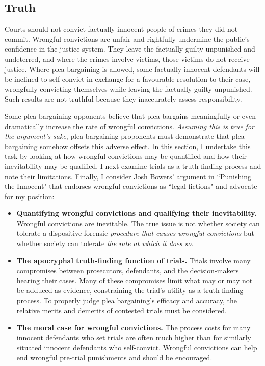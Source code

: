 \subsection{Truth}

Courts should not convict factually innocent people of crimes they did not commit. Wrongful convictions are unfair and rightfully undermine the public's confidence in the justice system. They leave the factually guilty unpunished and undeterred, and where the crimes involve victims, those victims do not receive justice. Where plea bargaining is allowed, some factually innocent defendants will be inclined to self-convict in exchange for a favourable resolution to their case, wrongfully convicting themselves while leaving the factually guilty unpunished. Such results are not truthful because they inaccurately assess responsibility. 

Some plea bargaining opponents believe that plea bargains meaningfully or even dramatically increase the rate of wrongful convictions. \textit{Assuming this is true for the argument's sake}, plea bargaining proponents must demonstrate that plea bargaining somehow offsets this adverse effect. In this section, I undertake this task by looking at how wrongful convictions may be quantified and how their inevitability may be qualified. I next examine trials as a truth-finding process and note their limitations. Finally, I consider Josh Bowers' argument in ``Punishing the Innocent" that endorses wrongful convictions as ``legal fictions" and advocate for my position:

\begin{itemize}
    \item \textbf{Quantifying wrongful convictions and qualifying their inevitability.} Wrongful convictions are inevitable. The true issue is not whether society can tolerate a dispositive forensic \textit{procedure that causes wrongful convictions} but whether society can tolerate \textit{the rate at which it does so}.
    \item \textbf{The apocryphal truth-finding function of trials.} Trials involve many compromises between prosecutors, defendants, and the decision-makers hearing their cases. Many of these compromises limit what may or may not be adduced as evidence, constraining the trial's utility as a truth-finding process. To properly judge plea bargaining's efficacy and accuracy, the relative merits and demerits of contested trials must be considered.
    \item \textbf{The moral case for wrongful convictions.} The process costs for many innocent defendants who set trials are often much higher than for similarly situated innocent defendants who self-convict. Wrongful convictions can help end wrongful pre-trial punishments and should be encouraged.
    
\end{itemize}

